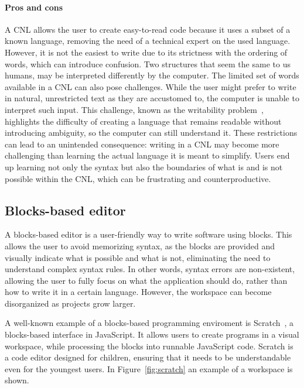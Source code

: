 \documentclass[11pt,a4paper]{report}
\begin{document}
\paragraph{Pros and cons}
A CNL allows the user to create easy-to-read code because it uses a subset of a known language, removing the need of a technical expert on the used language. However, it is not the easiest to write due to its strictness with the ordering of words, which can introduce confusion. Two structures that seem the same to us humans, may be interpreted differently by the computer. The limited set of words available in a CNL can also pose challenges. While the user might prefer to write in natural, unrestricted text as they are accustomed to, the computer is unable to interpret such input. This challenge, known as the writability problem~\cite{CNL}, highlights the difficulty of creating a language that remains readable without introducing ambiguity, so the computer can still understand it.
These restrictions can lead to an unintended consequence: writing in a CNL may become more challenging than learning the actual language it is meant to simplify. Users end up learning not only the syntax but also the boundaries of what is and is not possible within the CNL, which can be frustrating and counterproductive.

\subsection{Blocks-based editor}
A blocks-based editor is a user-friendly way to write software using blocks. This allows the user to avoid memorizing syntax, as the blocks are provided and visually indicate what is possible and what is not, eliminating the need to understand complex syntax rules. In other words, syntax errors are non-existent, allowing the user to fully focus on what the application should do, rather than how to write it in a certain language. However, the workspace can become disorganized as projects grow larger.

A well-known example of a blocks-based programming enviroment is Scratch~\cite{scratch}, a blocks-based interface in JavaScript. It allows users to create programs in a visual workspace, while processing the blocks into runnable JavaScript code. Scratch is a code editor designed for children, ensuring that it needs to be understandable even for the youngest users. In Figure~\ref{fig:scratch} an example of a workspace is shown.
\end{document}
